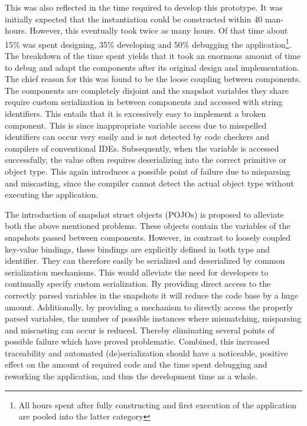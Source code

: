 This was also reflected in the time required to develop this prototype. It was initially expected that the instantiation could be constructed within 40 man-hours. However, this eventually took twice as many hours. Of that time about 15\% was spent designing, 35\% developing and 50\% debugging the application\footnote{All hours spent after fully constructing and first execution of the application are pooled into the latter category}. The breakdown of the time spent yields that it took an enormous amount of time to debug and adapt the components after its original design and implementation. The chief reason for this was found to be the loose coupling between components. The components are completely disjoint and the snapshot variables they share require custom serialization in between components and accessed with string identifiers. This entails that it is excessively easy to implement a broken component. This is since inappropriate variable access due to misspelled identifiers can occur very easily and is not detected by code checkers and compilers of conventional IDEs. Subsequently, when the variable is accessed successfully, the value often requires deserializing into the correct primitive or object type. This again introduces a possible point of failure due to misparsing and miscasting, since the compiler cannot detect the actual object type without executing the application.

The introduction of snapshot struct objects (POJOs) is proposed to alleviate both the above mentioned problems. These objects contain the variables of the snapshots passed between components. However, in contrast to loosely coupled key-value bindings, these bindings are explicitly defined in both type and identifier. They can therefore easily be serialized and deserialized by common serialization mechanisms. This would alleviate the need for developers to continually specify custom serialization. By providing direct access to the correctly parsed variables in the snapshots it will reduce the code base by a huge amount. Additionally, by providing a mechanism to directly access the properly parsed variables, the number of possible instances where mismatching, misparsing and miscasting can occur is reduced. Thereby eliminating several points of possible failure which have proved problematic. Combined, this increased traceability and automated (de)serialization should have a noticeable, positive effect on the amount of required code and the time spent debugging and reworking the application, and thus the development time as a whole.

